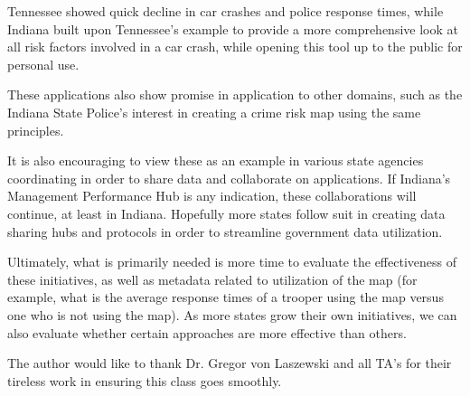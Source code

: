 \documentclass[sigconf]{acmart}
\begin{document}
Tennessee showed quick decline in car crashes and police response times, while Indiana built upon Tennessee's example to provide a more comprehensive look at all risk factors involved in a car crash, while opening this tool up to the public for personal use. 

These applications also show promise in application to other domains, such as the Indiana State Police's interest in creating a crime risk map using the same principles. 

It is also encouraging to view these as an example in various state agencies coordinating in order to share data and collaborate on applications. If Indiana's Management Performance Hub is any indication, these collaborations will continue, at least in Indiana. Hopefully more states follow suit in creating data sharing hubs and protocols in order to streamline government data utilization.

Ultimately, what is primarily needed is more time to evaluate the effectiveness of these initiatives, as well as metadata related to utilization of the map (for example, what is the average response times of a trooper using the map versus one who is not using the map). As more states grow their own initiatives, we can also evaluate whether certain approaches are more effective than others.

\begin{acks}

  The author would like to thank Dr. Gregor von Laszewski and all TA's for their tireless work in ensuring this class goes smoothly.

\end{acks}


 

\appendix


\end{document}
